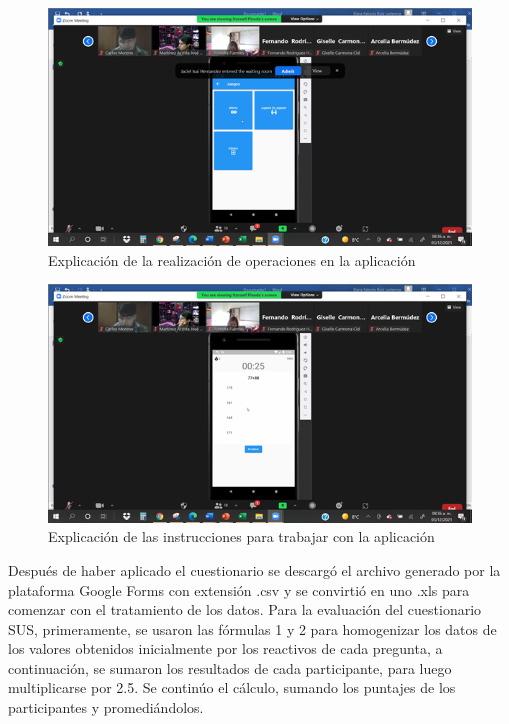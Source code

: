 \documentclass{article}
\begin{document}
\begin{figure}[H]
    \centering
    \includegraphics[scale=0.7]{imgs/pruebas/pruebas_02.png}
    \caption{Explicación de la realización de operaciones en la aplicación}
\end{figure}

\begin{figure}[H]
    \centering
    \includegraphics[scale=0.7]{imgs/pruebas/pruebas_03.png}
    \caption{Explicación de las instrucciones para trabajar con la aplicación}
\end{figure}

Después de haber aplicado el cuestionario se descargó el archivo generado por la plataforma 
Google Forms con extensión .csv y se convirtió en uno .xls para comenzar con el tratamiento 
de los datos. Para la evaluación del cuestionario SUS, primeramente, se usaron las fórmulas 
1 y 2 para homogenizar los datos de los valores obtenidos inicialmente por los reactivos de 
cada pregunta, a continuación, se sumaron los resultados de cada participante, para luego 
multiplicarse por 2.5. Se continúo el cálculo, sumando los puntajes de los participantes y 
promediándolos. 
\end{document}
